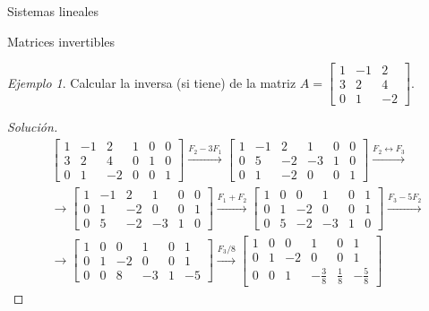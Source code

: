 \documentclass[a4paper,12pt,twoside,spanish,reqno]{amsbook}
\numberwithin{equation}{section}
\theoremstyle{definition}
\theoremstyle{remark}
\newtheorem*{ejemplo*}{Ejemplo}
\begin{document}
\begin{chapter}{Sistemas lineales}
\begin{section}{Matrices invertibles}
            \begin{ejemplo*}
                Calcular la inversa (si tiene) de la matriz $A=\begin{bmatrix}
                1&-1&2\\ 3&2&4\\ 0&1&-2
                \end{bmatrix}$. 
            \end{ejemplo*}
            \begin{proof}[Solución]
                \begin{align*} 
                &\left[\begin{array}{rrr|rrr}	1&-1&2&1&0&0\\ 3&2&4&0&1&0\\ 0&1&-2&0&0&1 \end{array}\right]
                \stackrel{F_2-3 F_1}{\longrightarrow}
                \left[\begin{array}{rrr|rrr}	1&-1&2
                &1&0&0\\ 0&5&-2&-3&1&0\\ 0&1&-2&0&0&1 \end{array}\right]
                \stackrel{F_2\leftrightarrow F_3}{\longrightarrow} \\
                &\longrightarrow 
                \left[\begin{array}{rrr|rrr}	1&-1&2&1&0&0\\ 0&1&-2&0&0&1 \\ 0&5&-2&-3&1&0 \end{array}\right]
                \stackrel{F_1 + F_2}{\longrightarrow}
                \left[\begin{array}{rrr|rrr}	1&0&0&1&0&1\\ 0&1&-2&0&0&1 \\ 0&5&-2&-3&1&0 \end{array}\right]
                \stackrel{F_3-5F_2}{\longrightarrow} \\
                &\longrightarrow
                \left[\begin{array}{rrr|rrr}	1&0&0&1&0&1\\ 0&1&-2&0&0&1 \\ 0&0&8&-3&1&-5 \end{array}\right]
                \stackrel{F_3/8}{\longrightarrow}
                \left[\begin{array}{rrr|rrr}	1&0&0&1&0&1\\ 0&1&-2&0&0&1 \\ 0&0&1&-\frac38&\frac18&-\frac58 \end{array}\right]

\end{align*}
\end{proof}
\end{section}
\end{chapter}
\end{document}
